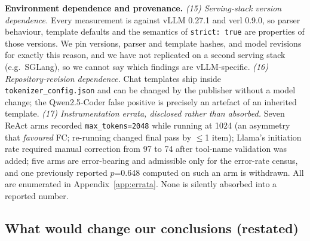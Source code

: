 \textbf{Environment dependence and provenance.}
\emph{(15) Serving-stack version dependence.} Every measurement is against vLLM 0.27.1 and verl
0.9.0, so parser behaviour, template defaults and the semantics of \texttt{strict: true} are
properties of those versions. We pin versions, parser and template hashes, and model revisions for
exactly this reason, and we have not replicated on a second serving stack (e.g.\ SGLang), so we
cannot say which findings are vLLM-specific.
\emph{(16) Repository-revision dependence.} Chat templates ship inside
\texttt{tokenizer\_config.json} and can be changed by the publisher without a model change; the
Qwen2.5-Coder false positive is precisely an artefact of an inherited template.
\emph{(17) Instrumentation errata, disclosed rather than absorbed.} Seven ReAct arms recorded
\texttt{max\_tokens=2048} while running at 1024 (an asymmetry that \emph{favoured} FC; re-running
changed final pass by $\leq$1 item); Llama's initiation rate required manual correction from 97 to
74 after tool-name validation was added; five arms are error-bearing and admissible only for the
error-rate census, and one previously reported $p$=0.648 computed on such an arm is withdrawn. All
are enumerated in Appendix~\ref{app:errata}. None is silently absorbed into a reported number.

\subsection*{What would change our conclusions (restated)}

